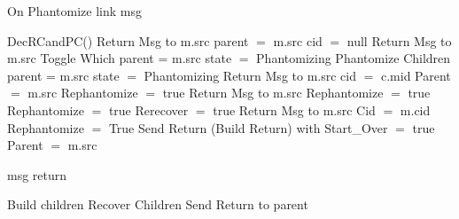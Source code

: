 \documentclass{article}
\begin{document}
\begin{algorithm}
\caption{On Phantomize link msg}
\label{Phantom message received}
\begin{algorithmic}[1]
\State DecRCandPC()
			\State Return Msg to m.src
		\Else
			\State parent $=$ m.src
			\State cid $=$ null
		\EndIf
	\Else
			\State Return Msg to m.src
				\State Toggle Which
			\EndIf
			\State parent = m.src
			\State state $=$ Phantomizing
			\State Phantomize Children
		\Else
			\State parent = m.src
			\State state $=$ Phantomizing
			\State Return Msg to m.src
			\EndIf
	\EndIf
{}
			\State cid $=$ c.mid
			\State Parent $=$ m.src
			\State Rephantomize $=$ true
		\Else 
			\State Return Msg  to m.src
				\State Rephantomize $=$ true	
			\EndIf
		\EndIf
	\Else 
				\State Rephantomize $=$ true
				\State Rerecover $=$ true
			\EndIf
			\State Return Msg to m.src
		\Else
			\State Cid $=$ m.cid
			\State Rephantomize $=$ True
			\State Send Return (Build Return) with Start\_Over $ =$ true
			\State Parent $=$ m.src
		\EndIf
	\EndIf
\EndIf
\EndProcedure
\end{algorithmic}
\end{algorithm}	
	
	
\begin{algorithm}
\caption{msg return}
\label{ Done message received}
\begin{algorithmic}[1]
				\State Build children
			\Else
				\State Recover Children
			\EndIf
		\Else
			\State Send Return to parent
		\EndIf
	\EndIf
\EndIf

\EndProcedure
\end{algorithmic}
\end{algorithm}
\end{document}
